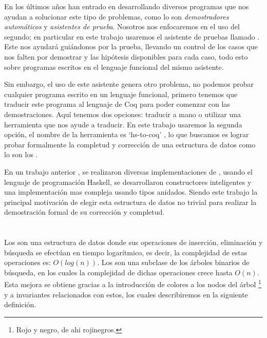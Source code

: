 En los últimos años han entrado en desarrollando diversos programas que nos ayudan a solucionar
este tipo de problemas, como lo son \textit{demostradores autom\'aticos} y \textit{asistentes de
prueba}. Nosotros nos enfocaremos en el uso del segundo; en particular en este trabajo usaremos el
asistente de pruebas llamado {\coq}. Este nos ayudar\'a gui\'andonos por la prueba, llevando un
control de los casos que nos falten por demostrar y las hip\'otesis disponibles para cada caso,
todo esto sobre programas escritos en el lenguaje funcional del mismo asistente.

Sin embargo, el uso de este asistente genera otro problema, no podemos probar cualquier programa
escrito en un lenguaje funcional, primero tenemos que traducir este programa al lenguaje de Coq
para poder comenzar con las demostraciones. Aquí tenemos dos opciones: traducir a mano o utilizar
una herramienta que nos ayude a traducir. En este trabajo usaremos la segunda opci\'on, el nombre
de la herramienta es `hs-to-coq' \cite{thrc}, lo que buscamos es lograr probar formalmente la
completud y correcci\'on de una estructura de datos como lo son los {\arns}.

En un trabajo anterior \cite{tesisG}, se realizaron diversas implementaciones de {\arns}, usando el
lenguaje de programaci\'on Haskell, se desarrollaron constructores inteligentes y una
implementaci\'on mas compleja usando tipos anidados. Siendo este trabajo la principal motivaci\'on
de elegir esta estructura de datos no trivial para realizar la demostraci\'on formal de su
corrección y completud.

\section{\Arns}
Los {\arns} son una estructura de datos donde sus operaciones de inserci\'on, eliminaci\'on y
búsqueda se efectúan en tiempo logarítmico, es decir, la complejidad de estas operaciones es:
$O(log(n))$. Los {\arns} son una subclase de los \'arboles binarios de búsqueda, en los cuales la
complejidad de dichas operaciones crece hasta $O(n)$. Esta mejora se obtiene gracias a la
introducción de colores a los nodos del \'arbol \footnote{Rojo y negro, de ahi rojinegros.} y a
invariantes relacionados con estos, los cuales describiremos en la siguiente definici\'on.

